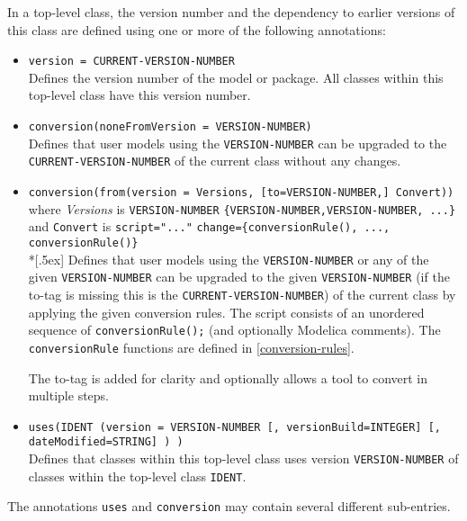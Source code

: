 In a top-level class, the version number and the dependency to earlier versions of this class are defined using one or more of the following annotations:
\begin{itemize}
\item
  \lstinline!version = CURRENT-VERSION-NUMBER!\\
  Defines the version number of the model or package.
  All classes within this top-level class have this version number.
\item
  \lstinline!conversion(noneFromVersion = VERSION-NUMBER)!\\
  Defines that user models using the \lstinline!VERSION-NUMBER! can be upgraded to the \lstinline!CURRENT-VERSION-NUMBER! of the current class without any changes.
\item
  \lstinline!conversion(from(version = Versions, [to=VERSION-NUMBER,] Convert))!\\
  where \emph{Versions} is \lstinline!VERSION-NUMBER! \textbar{} \lstinline!{VERSION-NUMBER,VERSION-NUMBER, ...}! and \lstinline!Convert! is \lstinline!script="..."! \textbar{} \lstinline!change={conversionRule(), ..., conversionRule()}!\\*[.5ex]
  Defines that user models using the \lstinline!VERSION-NUMBER! or any of the given \lstinline!VERSION-NUMBER! can be upgraded to the given \lstinline!VERSION-NUMBER! (if the to-tag is missing this is the \lstinline!CURRENT-VERSION-NUMBER!) of the current class by applying the given conversion rules.
  The script consists of an unordered sequence of \lstinline!conversionRule();! (and optionally Modelica comments).
  The \lstinline!conversionRule! functions are defined in \cref{conversion-rules}.

  \begin{nonnormative}
  The to-tag is added for clarity and optionally allows a tool to convert in multiple steps.
  \end{nonnormative}
\item
  \lstinline!uses(IDENT (version = VERSION-NUMBER [, versionBuild=INTEGER] [, dateModified=STRING] ) )!\\
  Defines that classes within this top-level class uses version \lstinline!VERSION-NUMBER! of classes within the top-level class \lstinline!IDENT!.
\end{itemize}

The annotations \lstinline!uses! and \lstinline!conversion! may contain several different sub-entries.

